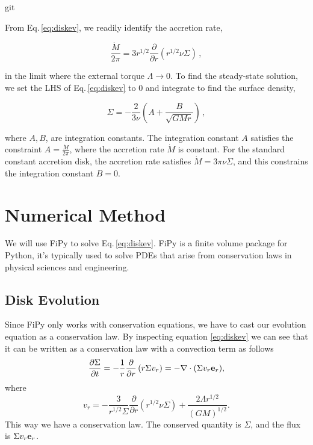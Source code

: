 git\documentclass{article}
\begin{document}
From Eq.\,\ref{eq:diskev}, we readily identify the accretion rate,

\begin{equation}
\frac{\dot{M}}{2\pi} = 3 r^{1/2} \frac{\partial}{\partial r} \left(r^{1/2} \nu \Sigma\right)\,,
\end{equation}

in the limit where the external torque $\Lambda \rightarrow 0$. To find the steady-state solution, we set the LHS of Eq.\,\ref{eq:diskev} to 0 and integrate to find the surface density,

\begin{equation}
\Sigma = -\frac{2}{3 \nu} \left(A+  \frac{B}{\sqrt{G M r}}\right)\,,
\end{equation}

where $A, B$, are integration constants. The integration constant $A$ satisfies the constraint $A = \frac{\dot{M}}{2\pi}$, where the accretion rate $\dot{M}$ is constant. For the standard constant accretion disk, the accretion rate satisfies $\dot{M} = 3\pi \nu \Sigma$, and this constrains the integration constant $B = 0$.

\section{Numerical Method}

We will use FiPy to solve Eq.\,\ref{eq:diskev}. FiPy is a finite volume package for Python, it's typically used to
solve PDEs that arise from conservation laws in physical sciences and engineering.

\subsection{Disk Evolution}
Since FiPy only works with conservation equations, we have to cast our evolution equation as a conservation law.
By inspecting equation \ref{eq:diskev} we can see that it can be written as a conservation law with a convection 
term as follows
\begin{equation} \label{eq:conservation}
\frac{\partial \Sigma}{\partial t} = -\frac{1}{r} \frac{\partial}{\partial r} \left( r \Sigma v_{r}\right)=-\nabla\cdot (\Sigma v_r \bold{e}_{r}),
\end{equation}
where
\begin{equation} \label{eq:vr}
v_r = -\frac{3}{r^{1/2}\Sigma} \frac{\partial}{\partial r} \left(r^{1/2} \nu \Sigma\right) + \frac{2 \Lambda r^{1/2}}{(G M)^{1/2}}.
\end{equation}
This way we have a conservation law. The conserved quantity is $\Sigma$, and the flux is $\Sigma v_r \bold{e}_r$.
\end{document}
